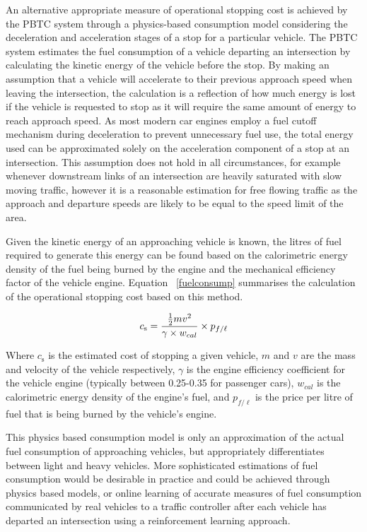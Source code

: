 An alternative appropriate measure of operational stopping cost is achieved by the PBTC system through a physics-based consumption model considering the deceleration and acceleration stages of a stop for a particular vehicle. The PBTC system estimates the fuel consumption of a vehicle departing an intersection by calculating the kinetic energy of the vehicle before the stop. By making an assumption that a vehicle will accelerate to their previous approach speed when leaving the intersection, the calculation is a reflection of how much energy is lost if the vehicle is requested to stop as it will require the same amount of energy to reach approach speed. As most modern car engines employ a fuel cutoff mechanism during deceleration to prevent unnecessary fuel use, the total energy used can be approximated solely on the acceleration component of a stop at an intersection. This assumption does not hold in all circumstances, for example whenever downstream links of an intersection are heavily saturated with slow moving traffic, however it is a reasonable estimation for free flowing traffic as the approach and departure speeds are likely to be equal to the speed limit of the area. 

Given the kinetic energy of an approaching vehicle is known, the litres of fuel required to generate this energy can be found based on the calorimetric energy density of the fuel being burned by the engine and the mechanical efficiency factor of the vehicle engine. Equation ~\ref{fuelconsump} summarises the calculation of the operational stopping cost based on this method.

\begin{align}
	\centering
		c_\text{s} = {\frac{\frac{1}{2}m{v}^{2} }{\gamma \times w_{cal}}} \times {p_{f\text{/}\ell}}
	\label{fuelconsump}
\end{align}

Where $c_\text{s}$ is the estimated cost of stopping a given vehicle, $m$ and $v$ are the mass and velocity of the vehicle respectively, $\gamma$ is the engine efficiency coefficient for the vehicle engine (typically between 0.25-0.35 for passenger cars), $w_{cal}$ is the calorimetric energy density of the engine's fuel, and $p_{f\text{/}\ell}$ is the price per litre of fuel that is being burned by the vehicle's engine.

This physics based consumption model is only an approximation of the actual fuel consumption of approaching vehicles, but appropriately differentiates between light and heavy vehicles. More sophisticated estimations of fuel consumption would be desirable in practice and could be achieved through physics based models, or online learning of accurate measures of fuel consumption communicated by real vehicles to a traffic controller after each vehicle has departed an intersection using a reinforcement learning approach.

